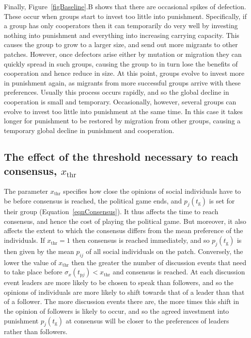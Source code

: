 \documentclass{rstb}
\begin{document}
\begin{linenumbers}
Finally, Figure~\ref{figBaseline}.B shows that there are occasional spikes of defection. These occur when groups start to invest too little into punishment. Specifically, if a group has only cooperators then it can temporarily do very well by investing nothing into punishment and everything into increasing carrying capacity. This causes the group to grow to a larger size, and send out more migrants to other patches. However, once defectors arise either by mutation or migration they can quickly spread in such groups, causing the group to in turn lose the benefits of cooperation and hence reduce in size. At this point, groups evolve to invest more in punishment again, as migrants from more successful groups arrive with these preferences. Usually this process occurs rapidly, and so the global decline in cooperation is small and temporary. Occasionally, however, several groups can evolve to invest too little into punishment at the same time. In this case it takes longer for punishment to be restored by migration from other groups, causing a temporary global decline in punishment and cooperation.

\subsection{The effect of the threshold necessary to reach consensus, $x_\mathrm{thr}$}
The parameter $x_\mathrm{thr}$ specifies how close the opinions of social individuals have to be before consensus is reached, the political game ends, and $p_j(t_\mathrm{g})$ is set for their group (Equation~\ref{eqnConsensus}). It thus affects the time to reach consensus, and hence the cost of playing the political game. But moreover, it also affects the extent to which the consensus differs from the mean preference of the individuals. If $x_\mathrm{thr}=1$ then consensus is reached immediately, and so $p_j(t_\mathrm{g})$ is then given by the mean $p_{ij}$ of all social individuals on the patch. Conversely, the lower the value of $x_\mathrm{thr}$ then the greater the number of discussion events that need to take place before $\sigma_x(t_{\mathrm{p}j}) < x_\mathrm{thr}$ and consensus is reached. At each discussion event leaders are more likely to be chosen to speak than followers, and so the opinions of individuals are more likely to shift towards that of a leader than that of a follower. The more discussion events there are, the more times this shift in the opinion of followers is likely to occur, and so the agreed investment into punishment $p_j(t_\mathrm{g})$ at consensus will be closer to the preferences of leaders rather than followers. 


\end{linenumbers}
\end{document}
